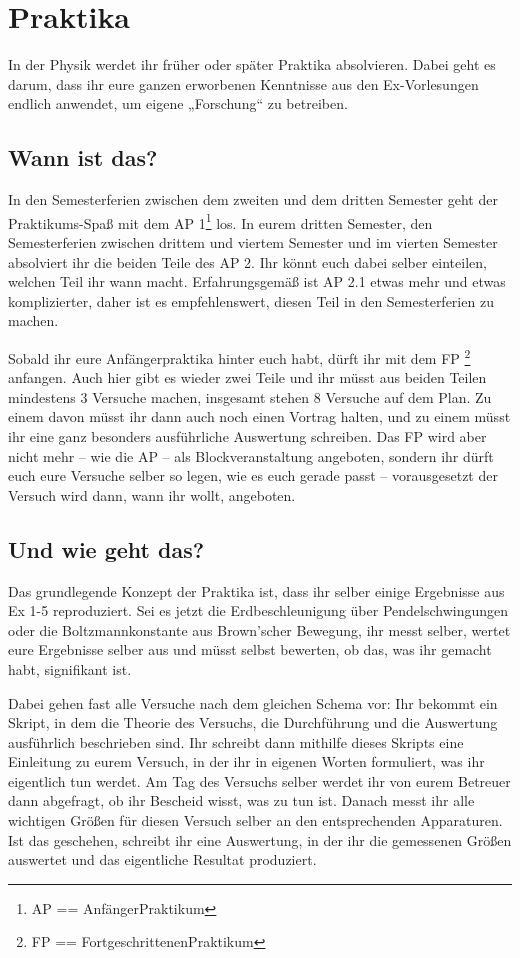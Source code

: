 \section{Praktika}

In der Physik werdet ihr früher oder später Praktika absolvieren. Dabei geht es darum, dass ihr eure ganzen erworbenen Kenntnisse aus den Ex-Vorlesungen endlich anwendet, um eigene „Forschung“ zu betreiben.

\subsection{Wann ist das?}
In den Semesterferien zwischen dem zweiten und dem dritten Semester geht der Praktikums-Spaß mit dem AP 1\footnote{AP == AnfängerPraktikum} los. In eurem dritten Semester, den Semesterferien zwischen drittem und viertem Semester und im vierten Semester absolviert ihr die beiden Teile des AP 2. Ihr könnt euch dabei selber einteilen, welchen Teil ihr wann macht. Erfahrungsgemäß ist AP 2.1 etwas mehr und etwas komplizierter, daher ist es empfehlenswert, diesen Teil in den Semesterferien zu machen.

Sobald ihr eure Anfängerpraktika hinter euch habt, dürft ihr mit dem FP \footnote{FP == FortgeschrittenenPraktikum} anfangen. Auch hier gibt es wieder zwei Teile und ihr müsst aus beiden Teilen mindestens 3 Versuche machen, insgesamt stehen 8 Versuche auf dem Plan. Zu einem davon müsst ihr dann auch noch einen Vortrag halten, und zu einem müsst ihr eine ganz besonders ausführliche Auswertung schreiben. Das FP wird aber nicht mehr -- wie die AP -- als Blockveranstaltung angeboten, sondern ihr dürft euch eure Versuche selber so legen, wie es euch gerade passt -- vorausgesetzt der Versuch wird dann, wann ihr wollt, angeboten.

\subsection{Und wie geht das?}
Das grundlegende Konzept der Praktika ist, dass ihr selber einige Ergebnisse aus Ex 1-5 reproduziert. Sei es jetzt die Erdbeschleunigung über Pendelschwingungen oder die Boltzmannkonstante aus Brown'scher Bewegung, ihr messt selber, wertet eure Ergebnisse selber aus und müsst selbst bewerten, ob das, was ihr gemacht habt, signifikant ist.

Dabei gehen fast alle Versuche nach dem gleichen Schema vor: Ihr bekommt ein Skript, in dem die Theorie des Versuchs, die Durchführung und die Auswertung ausführlich beschrieben sind. Ihr schreibt dann mithilfe dieses Skripts eine Einleitung zu eurem Versuch, in der ihr in eigenen Worten formuliert, was ihr eigentlich tun werdet. Am Tag des Versuchs selber werdet ihr von eurem Betreuer dann abgefragt, ob ihr Bescheid wisst, was zu tun ist. Danach messt ihr alle wichtigen Größen für diesen Versuch selber an den entsprechenden Apparaturen. Ist das geschehen, schreibt ihr eine Auswertung, in der ihr die gemessenen Größen auswertet und das eigentliche Resultat produziert.

